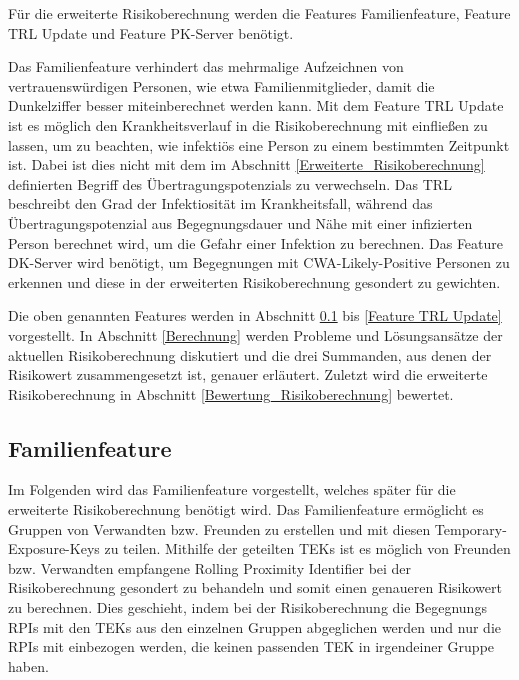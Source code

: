 \documentclass[conference,compsoc]{IEEEtran}
\begin{document}
Für die erweiterte Risikoberechnung werden die Features Familienfeature, Feature TRL Update und
Feature PK-Server benötigt.

Das Familienfeature verhindert das mehrmalige Aufzeichnen von vertrauenswürdigen Personen, wie etwa Familienmitglieder,
damit die Dunkelziffer besser miteinberechnet werden kann.
Mit dem Feature TRL Update ist es möglich den Krankheitsverlauf in die Risikoberechnung mit einfließen zu lassen, um zu beachten, wie infektiös eine Person zu einem bestimmten Zeitpunkt ist.
Dabei ist dies nicht mit dem im Abschnitt \ref{Erweiterte_Risikoberechnung} definierten Begriff des Übertragungspotenzials zu verwechseln.
Das TRL beschreibt den Grad der Infektiosität im Krankheitsfall, 
während das Übertragungspotenzial aus Begegnungsdauer und Nähe mit einer infizierten Person berechnet wird, um die Gefahr einer Infektion zu berechnen.  
Das Feature DK-Server wird benötigt, um Begegnungen mit CWA-Likely-Positive Personen zu erkennen und diese in der erweiterten Risikoberechnung gesondert zu gewichten.

Die oben genannten Features werden in Abschnitt \ref{Familienfeature} bis \ref{Feature TRL Update} vorgestellt.
In Abschnitt \ref{Berechnung} werden Probleme und Lösungsansätze der aktuellen Risikoberechnung diskutiert und die drei Summanden, aus denen der Risikowert zusammengesetzt ist, genauer erläutert.
Zuletzt wird die erweiterte Risikoberechnung in Abschnitt \ref{Bewertung_Risikoberechnung} bewertet.
\\
\subsection{Familienfeature}
\label{Familienfeature}

Im Folgenden wird das Familienfeature vorgestellt, welches später für die erweiterte Risikoberechnung benötigt wird.
Das Familienfeature ermöglicht es Gruppen von Verwandten bzw. Freunden zu erstellen und mit diesen Temporary-Exposure-Keys zu teilen.
Mithilfe der geteilten TEKs ist es möglich von Freunden bzw. Verwandten empfangene Rolling Proximity Identifier bei der Risikoberechnung gesondert zu behandeln und 
somit einen genaueren Risikowert zu berechnen.
Dies geschieht, indem bei der Risikoberechnung die Begegnungs RPIs mit den TEKs aus den einzelnen Gruppen abgeglichen werden und nur die RPIs mit einbezogen werden, 
die keinen passenden TEK in irgendeiner Gruppe haben.
\end{document}

